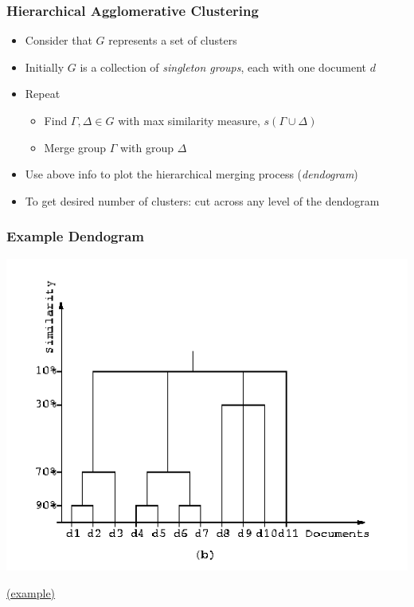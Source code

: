\documentclass{beamer}
\begin{document}
\begin{frame}
  \frametitle{Hierarchical Agglomerative Clustering}

  \begin{itemize}
  \item Consider that $G$ represents a set of clusters
  \item Initially $G$ is a collection of \emph{singleton groups}, each with one
    document $d$
  \item Repeat
    \begin{itemize}
    \item Find $\Gamma,\Delta \in G$ with max similarity measure,
      $s(\Gamma \cup \Delta)$
    \item Merge group $\Gamma$ with group $\Delta$
    \end{itemize}
  \item Use above info to plot the hierarchical merging process
    (\emph{dendogram})
  \item To get desired number of clusters: cut across any level of the
    dendogram
  \end{itemize}

\end{frame}


\begin{frame}
  \frametitle{Example Dendogram}

  \centering
  \includegraphics[width=.9\linewidth]{dendogram}  

  \raggedleft
  \tiny
  \href{http://www.bytemuse.com/post/crayon-hierarchical-clustering/}{(example)}

\end{frame}
\end{document}
